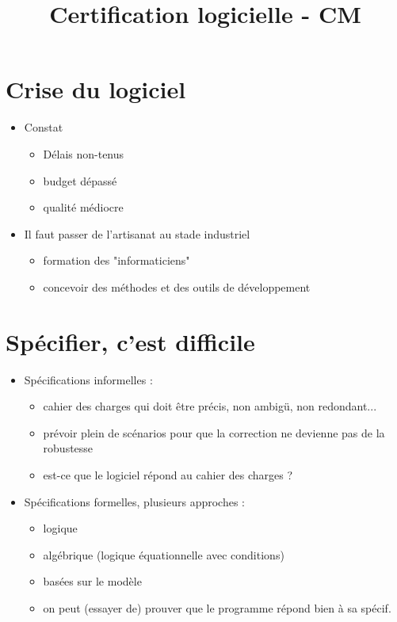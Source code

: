 \documentclass[11pt,a4paper]{article}
\title{Certification logicielle - CM}
\begin{document}
	
	\maketitle
	
	\section{Crise du logiciel}
	
	\begin{itemize}
		\item Constat
			\begin{itemize}
				\item Délais non-tenus
				\item budget dépassé
				\item qualité médiocre
			\end{itemize}
		\item Il faut passer de l'artisanat au stade industriel
			\begin{itemize}
				\item formation des "informaticiens"
				\item concevoir des méthodes et des outils de développement
			\end{itemize}
	\end{itemize}
	
	\section{Spécifier, c'est difficile}
	
	\begin{itemize}
		\item Spécifications informelles :
			\begin{itemize}
				\item cahier des charges qui doit être précis, non ambigü, non redondant...
				\item prévoir plein de scénarios pour que la correction ne devienne pas de la robustesse
				\item est-ce que le logiciel répond au cahier des charges ?
			\end{itemize}
		\item Spécifications formelles, plusieurs approches :
			\begin{itemize}
				\item logique
				\item algébrique (logique équationnelle avec conditions)
				\item basées sur le modèle
				\item on peut (essayer de) prouver que le programme répond bien à sa spécif.
			\end{itemize}
	\end{itemize}
\end{document}
